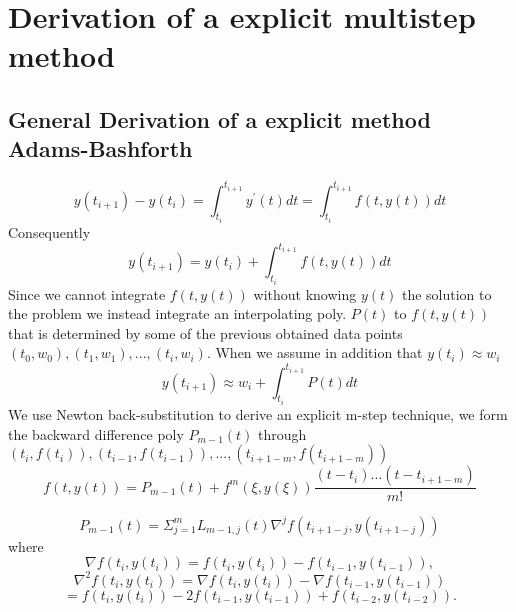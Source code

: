 \section{Derivation of a explicit multistep method}


\subsection{General Derivation of a explicit method Adams-Bashforth}

\[y(t_{i+1})-y(t_{i}) = \int_{t_i}^{t_{i+1}} y^{'}(t) dt=\int_{t_i}^{t_{i+1}} f(t,y(t)) dt \]
Consequently
\[y(t_{i+1})=y(t_{i}) + \int_{t_i}^{t_{i+1}} f(t,y(t)) dt\]
Since we cannot  integrate $f(t,y(t))$ without knowing $y(t)$ the solution to the problem
we instead integrate an interpolating poly. $P(t)$ to $f(t,y(t))$ that is determined
by some of the previous obtained data points $(t_0,w_0), (t_1,w_1),...,(t_i,w_i)$.
When we assume in addition that $y(t_i)\approx w_i$
\[y(t_{i+1})\approx w_{i} + \int_{t_i}^{t_{i+1}} P(t) dt\]
We use Newton back-substitution to derive an  explicit m-step technique,
we form the backward difference poly $P_{m-1}(t)$ through $(t_i,f(t_i)),(t_{i-1},f(t_{i-1})),...,(t_{i+1-m},f(t_{i+1-m}))$
\begin{equation}
    f(t,y(t))=P_{m-1}(t)+f^{m}(\xi,y(\xi))\frac{(t-t_i)...(t-t_{i+1-m})}{m!}
\end{equation}

\begin{equation}
    P_{m-1}(t)=\Sigma_{j=1}^{m} L_{m-1,j}(t)\nabla^j f(t_{i+1-j},y(t_{i+1-j}))\end{equation}
where \[\nabla f(t_i,y(t_i)) = f(t_i,y(t_i))-f(t_{i-1},y(t_{i-1})),\]
\[\nabla^2 f(t_i,y(t_i)) = \nabla f(t_i,y(t_i))-\nabla f(t_{i-1},y(t_{i-1}))\]
\[=f(t_i,y(t_i))-2f(t_{i-1},y(t_{i-1}))+f(t_{i-2},y(t_{i-2})).\]
